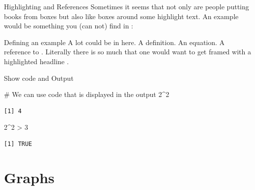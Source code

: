 \documentclass[11pt, aspectratio=169, t]{beamer}
\newenvironment{Shaded}{\begin{snugshade}}{\end{snugshade}}
\newcommand{\CommentTok}[1]{\textcolor[rgb]{0.37,0.37,0.37}{#1}}
\newcommand{\DecValTok}[1]{\textcolor[rgb]{0.68,0.00,0.00}{#1}}
\newcommand{\SpecialCharTok}[1]{\textcolor[rgb]{0.37,0.37,0.37}{#1}}
\begin{document}
\begin{frame}{Highlighting and References}
\label{highlighting-and-references}
Sometimes it seems that not only are people putting books from boxes but
also like boxes around some highlight text. An example would be
something you (can not) find in \textcite[LancetDH]{stern2022}:

\begin{exampleblock}{Defining an example}
\normalsize A lot could be in here. A definition. An equation. A reference to \textcite[REStud]{abadieSemiparametric2005}. Literally there is so much that one would want to get framed with a highlighted headline \autocites[LancetDH]{stern2022}[REStud]{abadieSemiparametric2005}. 
\end{exampleblock}
\end{frame}

\begin{frame}[fragile]{Show code and Output}
\label{show-code-and-output}
\begin{Shaded}
\begin{Highlighting}[]
\CommentTok{\# We can use code that is displayed in the output}
\DecValTok{2}\SpecialCharTok{\^{}}\DecValTok{2}
\end{Highlighting}
\end{Shaded}

\begin{verbatim}
[1] 4
\end{verbatim}

\begin{Shaded}
\begin{Highlighting}[]
\DecValTok{2}\SpecialCharTok{\^{}}\DecValTok{2} \SpecialCharTok{\textgreater{}} \DecValTok{3}
\end{Highlighting}
\end{Shaded}

\begin{verbatim}
[1] TRUE
\end{verbatim}
\end{frame}

\section{Graphs}\label{graphs}
\end{document}
